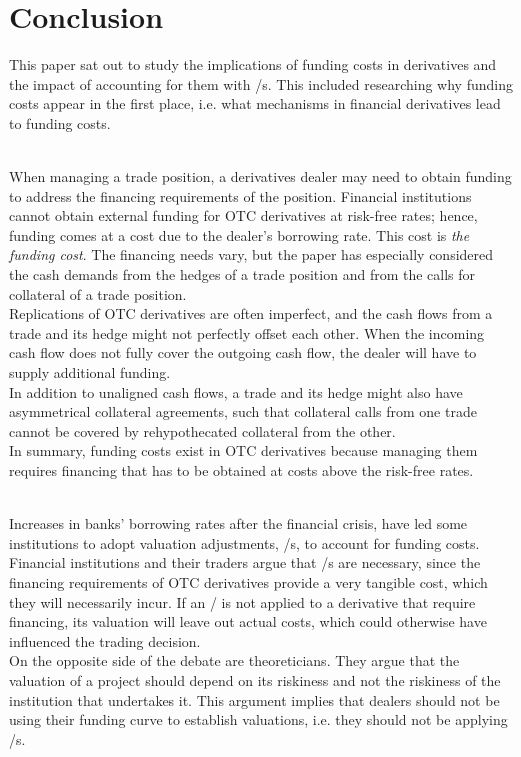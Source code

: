 \documentclass[main.tex]{subfiles}
\begin{document}
    \part{Conclusion}

    This paper sat out to study the implications
    of funding costs in derivatives and the impact of accounting for them with \FVA/s.
    This included researching why funding costs appear in the first place,
    i.e. what mechanisms in financial derivatives lead to funding costs.
    
    \textbf{\researchQuestionFundingCosts}\\
    When managing a trade position, a derivatives dealer may need to obtain funding 
    to address the financing requirements of the position.
    Financial institutions cannot obtain external funding for OTC derivatives at risk-free rates;
    hence, funding comes at a cost due to the dealer's borrowing rate.
    This cost is \textit{the funding cost}.
    The financing needs vary, but the paper has especially considered
    the cash demands from the hedges of a trade position
    and from the calls for collateral of a trade position.
    \\
    Replications of OTC derivatives are often imperfect,
    and the cash flows from a trade and its hedge might not perfectly offset each other.
    When the incoming cash flow does not fully cover the outgoing cash flow,
    the dealer will have to supply additional funding.
    \\
    In addition to unaligned cash flows, 
    a trade and its hedge might also have asymmetrical collateral agreements,
    such that collateral calls from one trade cannot be covered by rehypothecated collateral from the other.
    \\
    In summary, funding costs exist in OTC derivatives
    because managing them requires financing 
    that has to be obtained at costs above the risk-free rates.

    \textbf{\researchQuestionFvaDebate}\\
    Increases in banks' borrowing rates after the financial crisis,
    have led some institutions to adopt valuation adjustments, \FVA/s, to account for funding costs.
    Financial institutions and their traders argue that \FVA/s are necessary,
    since the financing requirements of OTC derivatives provide a very tangible cost,
    which they will necessarily incur.
    If an \FVA/ is not applied to a derivative that require financing,
    its valuation will leave out actual costs, 
    which could otherwise have influenced the trading decision.
    \\
    On the opposite side of the debate are theoreticians.
    They argue that the valuation of a project should depend on its riskiness
    and not the riskiness of the institution that undertakes it.
    This argument implies that dealers should not be using their funding curve to establish 
    valuations, i.e. they should not be applying \FVA/s.
\end{document}
